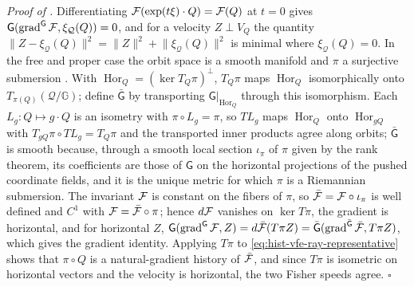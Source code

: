 \noindent\emph{Proof of .}
Differentiating $\mathcal F(\exp(t\xi)\cdot Q)=\mathcal F(Q)$ at $t=0$ gives
$\mathsf G(\operatorname{grad}^{\mathsf G}\mathcal F,\xi_{\mathcal Q}(Q))=0$, and for a
velocity $Z\perp V_Q$ the quantity $\lVert Z-\xi_{\mathcal Q}(Q)\rVert^2=\lVert
Z\rVert^2+\lVert\xi_{\mathcal Q}(Q)\rVert^2$ is minimal where $\xi_{\mathcal Q}(Q)=0$.
In the free and proper case the orbit space is a smooth manifold and $\pi$ a surjective
submersion \citep[Theorem~21.10]{Lee2012}.  With
$\operatorname{Hor}_Q=(\ker T_Q\pi)^\perp$, $T_Q\pi$ maps $\operatorname{Hor}_Q$
isomorphically onto $T_{\pi(Q)}(\mathcal Q/\mathbb G)$; define $\bar{\mathsf G}$ by
transporting $\mathsf G|_{\operatorname{Hor}_Q}$ through this isomorphism.  Each
$L_g:Q\mapsto g\cdot Q$ is an isometry with $\pi\circ L_g=\pi$, so $TL_g$ maps
$\operatorname{Hor}_Q$ onto $\operatorname{Hor}_{gQ}$ with $T_{gQ}\pi\circ TL_g=T_Q\pi$
and the transported inner products agree along orbits; $\bar{\mathsf G}$ is smooth
because, through a smooth local section $\iota_\pi$ of $\pi$ given by the rank theorem,
its coefficients are those of $\mathsf G$ on the horizontal projections of the pushed
coordinate fields, and it is the unique metric for which $\pi$ is a Riemannian
submersion.  The invariant $\mathcal F$ is constant on the fibers of $\pi$, so
$\bar{\mathcal F}=\mathcal F\circ\iota_\pi$ is well defined and $C^1$ with
$\mathcal F=\bar{\mathcal F}\circ\pi$; hence $d\mathcal F$ vanishes on $\ker T\pi$, the gradient
is horizontal, and for horizontal $Z$,
$\mathsf G(\operatorname{grad}^{\mathsf G}\mathcal F,Z)=d\bar{\mathcal F}(T\pi Z)
=\bar{\mathsf G}(\operatorname{grad}^{\bar{\mathsf G}}\bar{\mathcal F},T\pi Z)$, which gives
the gradient identity.  Applying $T\pi$ to \eqref{eq:hist-vfe-ray-representative} shows
that $\pi\circ Q$ is a natural-gradient history of $\bar{\mathcal F}$, and since $T\pi$ is
isometric on horizontal vectors and the velocity is horizontal, the two Fisher speeds
agree.  $\square$

